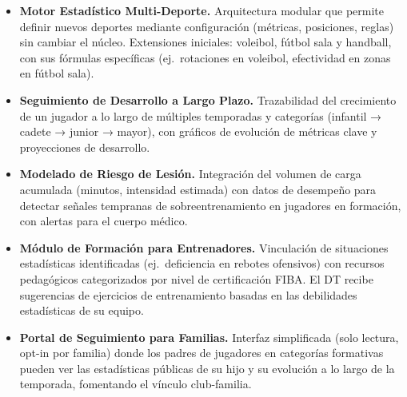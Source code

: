 \documentclass[11pt,a4paper]{article}
\begin{document}
\begin{itemize}
  \item \textbf{Motor Estadístico Multi-Deporte.} Arquitectura modular que permite definir nuevos deportes mediante configuración (métricas, posiciones, reglas) sin cambiar el núcleo. Extensiones iniciales: voleibol, fútbol sala y handball, con sus fórmulas específicas (ej.\ rotaciones en voleibol, efectividad en zonas en fútbol sala).

  \item \textbf{Seguimiento de Desarrollo a Largo Plazo.} Trazabilidad del crecimiento de un jugador a lo largo de múltiples temporadas y categorías (infantil → cadete → junior → mayor), con gráficos de evolución de métricas clave y proyecciones de desarrollo.

  \item \textbf{Modelado de Riesgo de Lesión.} Integración del volumen de carga acumulada (minutos, intensidad estimada) con datos de desempeño para detectar señales tempranas de sobreentrenamiento en jugadores en formación, con alertas para el cuerpo médico.

  \item \textbf{Módulo de Formación para Entrenadores.} Vinculación de situaciones estadísticas identificadas (ej.\ deficiencia en rebotes ofensivos) con recursos pedagógicos categorizados por nivel de certificación FIBA. El DT recibe sugerencias de ejercicios de entrenamiento basadas en las debilidades estadísticas de su equipo.

  \item \textbf{Portal de Seguimiento para Familias.} Interfaz simplificada (solo lectura, opt-in por familia) donde los padres de jugadores en categorías formativas pueden ver las estadísticas públicas de su hijo y su evolución a lo largo de la temporada, fomentando el vínculo club-familia.
\end{itemize}
\end{document}
